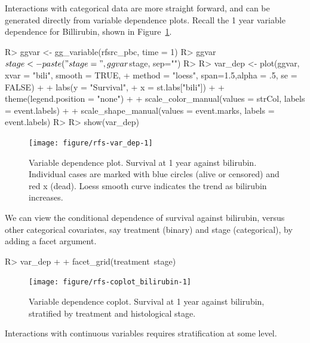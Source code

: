 \documentclass[nojss]{jss}
\begin{document}
Interactions with categorical data are more straight forward, and can be generated directly from variable dependence plots. Recall the 1 year variable dependence for Billirubin, shown in Figure~\ref{fig:var_dep}. 
\begin{Schunk}
\begin{Sinput}
R> ggvar <- gg_variable(rfsrc_pbc, time = 1)
R> ggvar$stage <- paste("stage=", ggvar$stage, sep="")
R> 
R> var_dep <- plot(ggvar, xvar = "bili", smooth = TRUE, 
+                 method = "loess", span=1.5,alpha = .5, se = FALSE) + 
+   labs(y = "Survival", 
+        x = st.labs["bili"]) + 
+   theme(legend.position = "none") + 
+   scale_color_manual(values = strCol, labels = event.labels) + 
+   scale_shape_manual(values = event.marks, labels = event.labels)
R> 
R> show(var_dep)
\end{Sinput}
\begin{figure}[!htpb]

{\centering \texttt{[image: figure/rfs-var\_dep-1]} 

}

\caption[Variable dependence plot]{Variable dependence plot. Survival at 1 year against bilirubin. Individual cases are marked with blue circles (alive or censored) and red x (dead). Loess smooth curve indicates the trend as bilirubin  increases.\label{fig:var_dep}}
\end{figure}
\end{Schunk}

We can view the conditional dependence of survival against bilirubin, versus other categorical covariates, say treatment (binary) and stage (categorical), by adding a facet argument.
\begin{Schunk}
\begin{Sinput}
R> var_dep + 
+   facet_grid(treatment~stage)
\end{Sinput}
\begin{figure}[!htpb]

{\centering \texttt{[image: figure/rfs-coplot\_bilirubin-1]} 

}

\caption[Variable dependence coplot]{Variable dependence coplot. Survival at 1 year against bilirubin, stratified by treatment and histological stage.\label{fig:coplot_bilirubin}}
\end{figure}
\end{Schunk}

Interactions with continuous variables requires stratification at some level.
\end{document}
